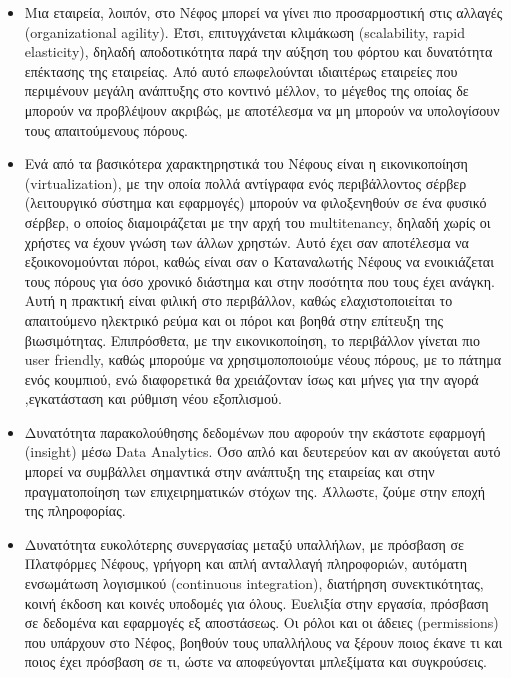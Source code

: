 \documentclass{article}
\begin{document}
\begin{itemize}
\item	Μια εταιρεία, λοιπόν, στο Νέφος μπορεί να γίνει πιο προσαρμοστική στις αλλαγές (organizational agility). Έτσι, επιτυγχάνεται κλιμάκωση (scalability, rapid elasticity), δηλαδή αποδοτικότητα παρά την αύξηση του φόρτου και δυνατότητα επέκτασης της εταιρείας. Από αυτό επωφελούνται ιδιαιτέρως εταιρείες που περιμένουν μεγάλη ανάπτυξης στο κοντινό μέλλον, το μέγεθος της οποίας δε μπορούν να προβλέψουν ακριβώς, με αποτέλεσμα να μη μπορούν να υπολογίσουν τους απαιτούμενους πόρους.

\item	Ενά από τα βασικότερα χαρακτηρηστικά του Νέφους είναι η εικονικοποίηση (virtualization), με την οποία πολλά αντίγραφα ενός περιβάλλοντος σέρβερ (λειτουργικό σύστημα και εφαρμογές) μπορούν να φιλοξενηθούν σε ένα φυσικό σέρβερ, ο οποίος διαμοιράζεται με την αρχή του multitenancy, δηλαδή χωρίς οι χρήστες να έχουν γνώση των άλλων χρηστών. Αυτό έχει σαν αποτέλεσμα  να εξοικονομούνται πόροι, καθώς είναι σαν ο Καταναλωτής Νέφους να ενοικιάζεται τους πόρους για όσο χρονικό διάστημα και στην ποσότητα που τους έχει ανάγκη. Αυτή η πρακτική είναι φιλική στο περιβάλλον, καθώς ελαχιστοποιείται το απαιτούμενο ηλεκτρικό ρεύμα και οι πόροι και βοηθά στην επίτευξη της βιωσιμότητας. Επιπρόσθετα, με την εικονικοποίηση, το περιβάλλον γίνεται πιο user friendly, καθώς μπορούμε να χρησιμοποποιούμε νέους πόρους, με το πάτημα ενός κουμπιού, ενώ διαφορετικά θα χρειάζονταν ίσως και μήνες για την αγορά ,εγκατάσταση και ρύθμιση νέου εξοπλισμού.

\item	Δυνατότητα παρακολούθησης δεδομένων που αφορούν την εκάστοτε εφαρμογή (insight) μέσω Data Analytics. Όσο απλό και δευτερεύον και αν ακούγεται αυτό μπορεί να συμβάλλει σημαντικά στην ανάπτυξη της εταιρείας και στην πραγματοποίηση των επιχειρηματικών στόχων της. Άλλωστε, ζούμε στην εποχή της πληροφορίας.

\item	Δυνατότητα ευκολότερης συνεργασίας μεταξύ υπαλλήλων, με πρόσβαση σε Πλατφόρμες Νέφους, γρήγορη και απλή ανταλλαγή πληροφοριών, αυτόματη ενσωμάτωση λογισμικού (continuous integration), διατήρηση συνεκτικότητας, κοινή έκδοση και κοινές υποδομές για όλους. Ευελιξία στην εργασία, πρόσβαση σε δεδομένα και εφαρμογές εξ αποστάσεως. Οι ρόλοι και οι άδειες (permissions) που υπάρχουν στο Νέφος, βοηθούν τους υπαλλήλους να ξέρουν ποιος έκανε τι και ποιος έχει πρόσβαση σε τι, ώστε να αποφεύγονται μπλεξίματα και συγκρούσεις.


\end{itemize}
\end{document}
